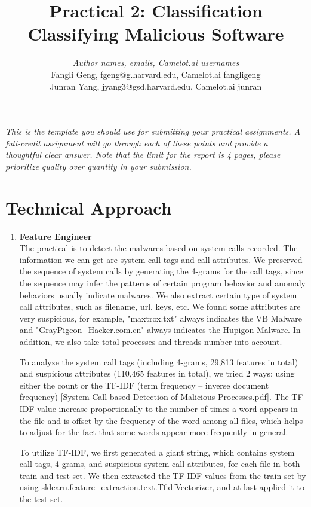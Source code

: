 \documentclass[11pt]{article}
\title{Practical 2: Classification\\ Classifying Malicious Software}
\author{\textit{Author names, emails, Camelot.ai usernames}\\
Fangli Geng, fgeng@g.harvard.edu, Camelot.ai fangligeng\\
Junran Yang, jyang3@gsd.harvard.edu, Camelot.ai junran}
\begin{document}
\maketitle{}


\noindent \textit{This is the template you should use for submitting your practical assignments. 
A full-credit assignment will go through each of these points and provide a thoughtful 
clear answer.  Note that the limit for the report is 4 pages, please prioritize quality over 
quantity in your submission.}

\section{Technical Approach}
\begin{enumerate}
\item \textbf{Feature Engineer}\\
The practical is to detect the malwares based on system calls recorded. The information we can get are system call tags and call attributes. We preserved the sequence of system calls by generating the 4-grams for the call tags, since the sequence may infer the patterns of certain program behavior and anomaly behaviors usually indicate malwares. We also extract certain type of system call attributes, such as filename, url, keys, etc. We found some attributes are very suspicious, for example, "maxtrox.txt" always indicates the VB Malware and "GrayPigeon\_Hacker.com.cn" always indicates the Hupigon Malware. In addition, we also take total processes and threads number into account.

To analyze the system call tags (including 4-grams, 29,813 features in total) and suspicious attributes (110,465 features in total), we tried 2 ways: using either the count or the TF-IDF (term frequency – inverse document frequency) [System Call-based Detection of Malicious Processes.pdf]. The TF-IDF value increase proportionally to the number of times a word appears in the file and is offset by the frequency of the word among all files, which helps to adjust for the fact that some words appear more frequently in general.

To utilize TF-IDF, we first generated a giant string, which contains system call tags, 4-grams, and suspicious system call attributes, for each file in both train and test set. We then extracted the TF-IDF values from the train set by using sklearn.feature\_extraction.text.TfidfVectorizer, and at last applied it to the test set. 


\end{enumerate}
\end{document}
